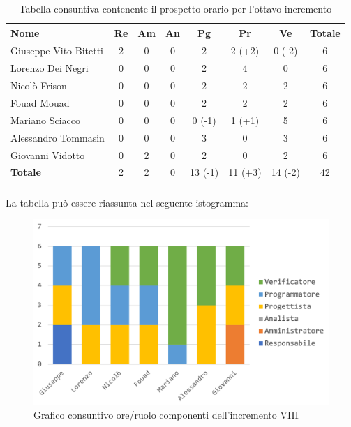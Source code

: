 		\begin{longtable}{|l|c|c|c|c|c|c|c|}
			\hline
			\rowcolor{lighter-grayer}
			\textbf{Nome} & \textbf{Re} & \textbf{Am} & \textbf{An} & \textbf{Pg}  & \textbf{Pr}   & \textbf{Ve} & \textbf{Totale} \\
			\hline
			\endfirsthead
			
			\hline
			Giuseppe Vito Bitetti 		 & 2 & 0 & 0 & 2 & 2 (+2) & 0 (-2) & 6\\
			\hline
			\hline
			Lorenzo Dei Negri			 & 0 & 0 & 0 & 2 & 4 & 0 & 6\\
			\hline
			\hline
			Nicolò Frison				      & 0 & 0 & 0 & 2 & 2 & 2 & 6\\
			\hline
			\hline
			Fouad Mouad 				   & 0 & 0 & 0 & 2 & 2 & 2 & 6\\
			\hline
			\hline
			Mariano Sciacco 			 & 0 & 0 & 0 & 0 (-1) & 1 (+1) & 5 & 6\\
			\hline
			\hline
			Alessandro Tommasin    & 0 & 0 & 0 & 3 & 0 & 3 & 6\\
			\hline
			\hline
			Giovanni Vidotto 			  & 0 & 2 & 0 & 2 & 0 & 2 & 6\\
			\hline 
			\textbf{Totale}			 		 & 2 & 2 & 0 & 13 (-1) & 11 (+3) & 14 (-2) & 42\\
			\hline
			\caption{Tabella consuntiva contenente il prospetto orario per l'ottavo incremento}
		\end{longtable}
		
		La tabella può essere riassunta nel seguente istogramma:
		
		\begin{figure}[H]
			\centering
			\includegraphics[width=0.8\linewidth]{images/consuntivo/ConsIncr8-1.png}
			\caption{Grafico consuntivo ore/ruolo componenti dell'incremento VIII}
			\label{fig:consuntivo grafico suddivisione ruoli incremento VIII}
		\end{figure}
		
